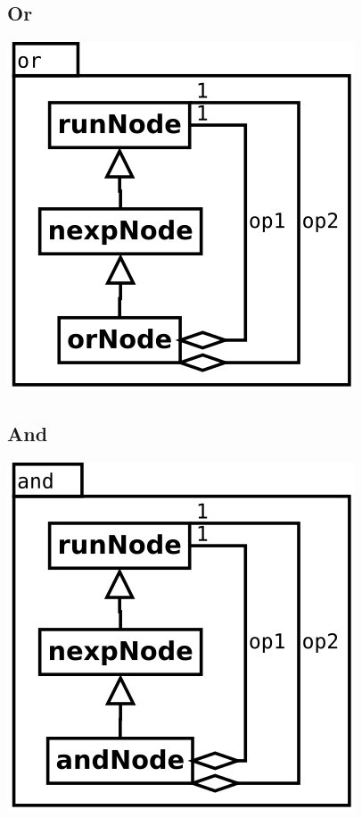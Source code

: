\subsection {Or}
\begin{center}
\includegraphics[scale=0.4]{or.png} \\
\end{center}

\subsection {And}
\begin{center}
\includegraphics[scale=0.4]{and.png} \\
\end{center}

